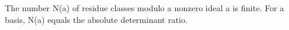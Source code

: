 The number N(a) of residue classes modulo a nonzero ideal a is finite. For a basis, N(a) equals the absolute determinant ratio.
